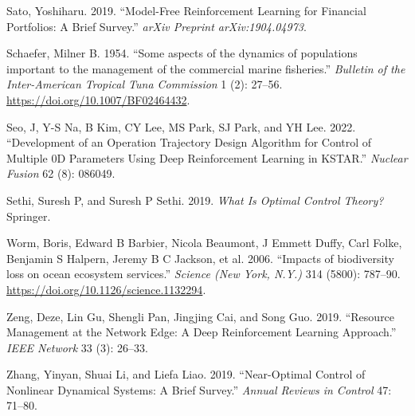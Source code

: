 \documentclass{article}
\newlength{\cslhangindent}
\newlength{\cslentryspacingunit} %
\newenvironment{CSLReferences}[2] %
 {%
  \setlength{\parindent}{0pt}
  \ifodd #1
  \let\oldpar\par
  \def\par{\hangindent=\cslhangindent\oldpar}
  \fi
  \setlength{\parskip}{#2\cslentryspacingunit}
 }%
 {}
\begin{document}
\begin{CSLReferences}{1}{0}
\leavevmode{}%
Sato, Yoshiharu. 2019. {``Model-Free Reinforcement Learning for
Financial Portfolios: A Brief Survey.''} \emph{arXiv Preprint
arXiv:1904.04973}.

\leavevmode{}%
Schaefer, Milner B. 1954. {``{Some aspects of the dynamics of
populations important to the management of the commercial marine
fisheries}.''} \emph{Bulletin of the Inter-American Tropical Tuna
Commission} 1 (2): 27--56. \url{https://doi.org/10.1007/BF02464432}.

\leavevmode{}%
Seo, J, Y-S Na, B Kim, CY Lee, MS Park, SJ Park, and YH Lee. 2022.
{``Development of an Operation Trajectory Design Algorithm for Control
of Multiple 0D Parameters Using Deep Reinforcement Learning in KSTAR.''}
\emph{Nuclear Fusion} 62 (8): 086049.

\leavevmode{}%
Sethi, Suresh P, and Suresh P Sethi. 2019. \emph{What Is Optimal Control
Theory?} Springer.

\leavevmode{}%
Worm, Boris, Edward B Barbier, Nicola Beaumont, J Emmett Duffy, Carl
Folke, Benjamin S Halpern, Jeremy B C Jackson, et al. 2006. {``{Impacts
of biodiversity loss on ocean ecosystem services.}''} \emph{Science (New
York, N.Y.)} 314 (5800): 787--90.
\url{https://doi.org/10.1126/science.1132294}.

\leavevmode{}%
Zeng, Deze, Lin Gu, Shengli Pan, Jingjing Cai, and Song Guo. 2019.
{``Resource Management at the Network Edge: A Deep Reinforcement
Learning Approach.''} \emph{IEEE Network} 33 (3): 26--33.

\leavevmode{}%
Zhang, Yinyan, Shuai Li, and Liefa Liao. 2019. {``Near-Optimal Control
of Nonlinear Dynamical Systems: A Brief Survey.''} \emph{Annual Reviews
in Control} 47: 71--80.

\end{CSLReferences}



\end{document}
